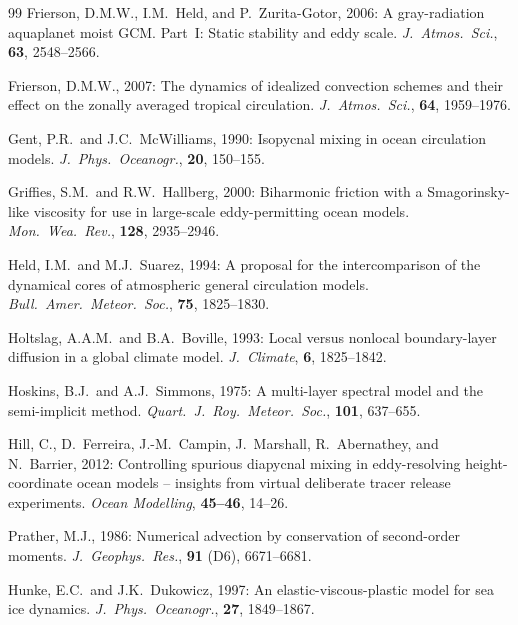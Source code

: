 \documentclass[11pt,twoside]{report}
\begin{document}
\begin{thebibliography}{99}
Frierson, D.M.W., I.M.~Held, and P.~Zurita-Gotor, 2006:
A gray-radiation aquaplanet moist GCM. Part~I: Static stability and
eddy scale.
\textit{J.\ Atmos.\ Sci.}, \textbf{63}, 2548--2566.

Frierson, D.M.W., 2007:
The dynamics of idealized convection schemes and their effect on the
zonally averaged tropical circulation.
\textit{J.\ Atmos.\ Sci.}, \textbf{64}, 1959--1976.

Gent, P.R.\ and J.C.~McWilliams, 1990:
Isopycnal mixing in ocean circulation models.
\textit{J.\ Phys.\ Oceanogr.}, \textbf{20}, 150--155.

Griffies, S.M.\ and R.W.~Hallberg, 2000:
Biharmonic friction with a Smagorinsky-like viscosity for use in
large-scale eddy-permitting ocean models.
\textit{Mon.\ Wea.\ Rev.}, \textbf{128}, 2935--2946.

Held, I.M.\ and M.J.~Suarez, 1994:
A proposal for the intercomparison of the dynamical cores of atmospheric
general circulation models.
\textit{Bull.\ Amer.\ Meteor.\ Soc.}, \textbf{75}, 1825--1830.

Holtslag, A.A.M.\ and B.A.~Boville, 1993:
Local versus nonlocal boundary-layer diffusion in a global climate model.
\textit{J.\ Climate}, \textbf{6}, 1825--1842.

Hoskins, B.J.\ and A.J.~Simmons, 1975:
A multi-layer spectral model and the semi-implicit method.
\textit{Quart.\ J.\ Roy.\ Meteor.\ Soc.}, \textbf{101}, 637--655.

Hill, C., D.~Ferreira, J.-M.~Campin, J.~Marshall, R.~Abernathey, and
N.~Barrier, 2012:
Controlling spurious diapycnal mixing in eddy-resolving height-coordinate
ocean models -- insights from virtual deliberate tracer release experiments.
\textit{Ocean Modelling}, \textbf{45--46}, 14--26.

Prather, M.J., 1986:
Numerical advection by conservation of second-order moments.
\textit{J.\ Geophys.\ Res.}, \textbf{91} (D6), 6671--6681.

Hunke, E.C.\ and J.K.~Dukowicz, 1997:
An elastic-viscous-plastic model for sea ice dynamics.
\textit{J.\ Phys.\ Oceanogr.}, \textbf{27}, 1849--1867.


\end{thebibliography}
\end{document}
